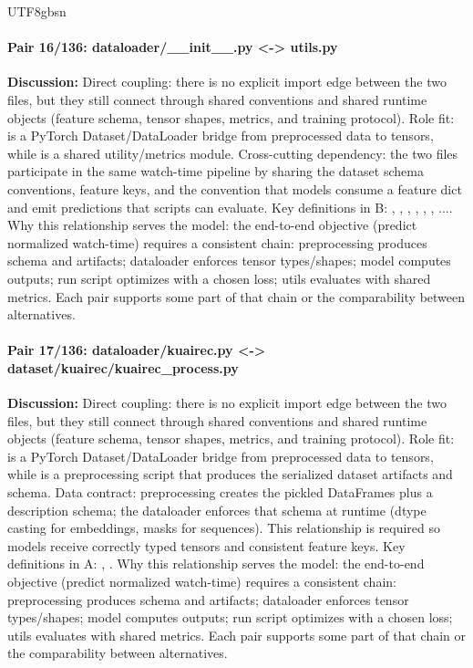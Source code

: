 \documentclass[11pt]{article}
\begin{document}
\begin{CJK*}{UTF8}{gbsn}
\paragraph{Pair 16/136: dataloader/\_\_init\_\_.py <-> utils.py}
\textbf{Discussion:} Direct coupling: there is no explicit import edge between the two files, but they still connect through shared conventions and shared runtime objects (feature schema, tensor shapes, metrics, and training protocol). Role fit: \texttt{} is a PyTorch Dataset/DataLoader bridge from preprocessed data to tensors, while \texttt{} is a shared utility/metrics module. Cross-cutting dependency: the two files participate in the same watch-time pipeline by sharing the dataset schema conventions, feature keys, and the convention that models consume a feature dict and emit predictions that scripts can evaluate. Key definitions in B: \texttt{}, \texttt{}, \texttt{}, \texttt{}, \texttt{}, \texttt{}, .... Why this relationship serves the model: the end-to-end objective (predict normalized watch-time) requires a consistent chain: preprocessing produces schema and artifacts; dataloader enforces tensor types/shapes; model computes outputs; run script optimizes with a chosen loss; utils evaluates with shared metrics. Each pair supports some part of that chain or the comparability between alternatives.

\paragraph{Pair 17/136: dataloader/kuairec.py <-> dataset/kuairec/kuairec\_process.py}
\textbf{Discussion:} Direct coupling: there is no explicit import edge between the two files, but they still connect through shared conventions and shared runtime objects (feature schema, tensor shapes, metrics, and training protocol). Role fit: \texttt{} is a PyTorch Dataset/DataLoader bridge from preprocessed data to tensors, while \texttt{} is a preprocessing script that produces the serialized dataset artifacts and schema. Data contract: preprocessing creates the pickled DataFrames plus a description schema; the dataloader enforces that schema at runtime (dtype casting for embeddings, masks for sequences). This relationship is required so models receive correctly typed tensors and consistent feature keys. Key definitions in A: \texttt{}, \texttt{}. Why this relationship serves the model: the end-to-end objective (predict normalized watch-time) requires a consistent chain: preprocessing produces schema and artifacts; dataloader enforces tensor types/shapes; model computes outputs; run script optimizes with a chosen loss; utils evaluates with shared metrics. Each pair supports some part of that chain or the comparability between alternatives.


\end{CJK*}
\end{document}
